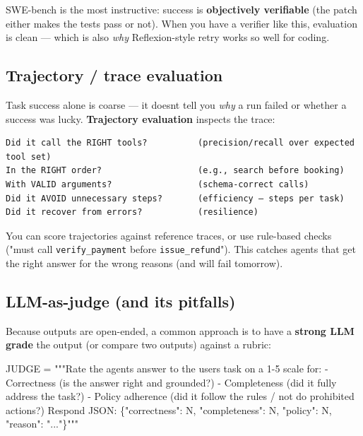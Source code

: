 \documentclass[11pt]{article}
\newenvironment{Shaded}{\begin{snugshade}}{\end{snugshade}}
\newcommand{\NormalTok}[1]{\textcolor[rgb]{0.81,0.81,0.76}{#1}}
\newcommand{\OperatorTok}[1]{\textcolor[rgb]{0.81,0.81,0.76}{#1}}
\newcommand{\StringTok}[1]{\textcolor[rgb]{0.96,0.31,0.31}{#1}}
\begin{document}
SWE-bench is the most instructive: success is \textbf{objectively verifiable} (the patch either makes the tests pass or not). When you have a verifier like this, evaluation is clean --- which is also \emph{why} Reflexion-style retry works so well for coding.

\subsection{Trajectory / trace evaluation}\label{trajectory--trace-evaluation}

Task success alone is coarse --- it doesn\textquotesingle t tell you \emph{why} a run failed or whether a success was lucky. \textbf{Trajectory evaluation} inspects the trace:

\setcodelang{}

\begin{verbatim}
Did it call the RIGHT tools?          (precision/recall over expected tool set)
In the RIGHT order?                   (e.g., search before booking)
With VALID arguments?                 (schema-correct calls)
Did it AVOID unnecessary steps?       (efficiency — steps per task)
Did it recover from errors?           (resilience)
\end{verbatim}

You can score trajectories against reference traces, or use rule-based checks ("must call \texttt{verify\_payment} before \texttt{issue\_refund}"). This catches agents that get the right answer for the wrong reasons (and will fail tomorrow).

\subsection{LLM-as-judge (and its pitfalls)}\label{llm-as-judge-and-its-pitfalls}

Because outputs are open-ended, a common approach is to have a \textbf{strong LLM grade} the output (or compare two outputs) against a rubric:


\begin{Shaded}
\begin{Highlighting}[]
\NormalTok{JUDGE }\OperatorTok{=} \StringTok{"""Rate the agent\textquotesingle{}s answer to the user\textquotesingle{}s task on a 1{-}5 scale for:}
\StringTok{{-} Correctness (is the answer right and grounded?)}
\StringTok{{-} Completeness (did it fully address the task?)}
\StringTok{{-} Policy adherence (did it follow the rules / not do prohibited actions?)}
\StringTok{Respond JSON: \{"correctness": N, "completeness": N, "policy": N, "reason": "..."\}"""}
\end{Highlighting}
\end{Shaded}
\end{document}
